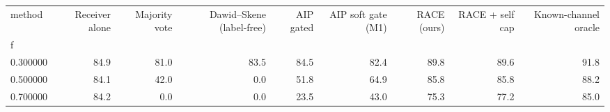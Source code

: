 \begin{tabular}{lrrrrrrrr}
\toprule
method & Receiver alone & Majority vote & Dawid–Skene (label-free) & AIP gated & AIP soft gate (M1) & RACE (ours) & RACE + self cap & Known-channel oracle \\
f &  &  &  &  &  &  &  &  \\
\midrule
0.300000 & 84.9 & 81.0 & 83.5 & 84.5 & 82.4 & 89.8 & 89.6 & 91.8 \\
0.500000 & 84.1 & 42.0 & 0.0 & 51.8 & 64.9 & 85.8 & 85.8 & 88.2 \\
0.700000 & 84.2 & 0.0 & 0.0 & 23.5 & 43.0 & 75.3 & 77.2 & 85.0 \\
\bottomrule
\end{tabular}
